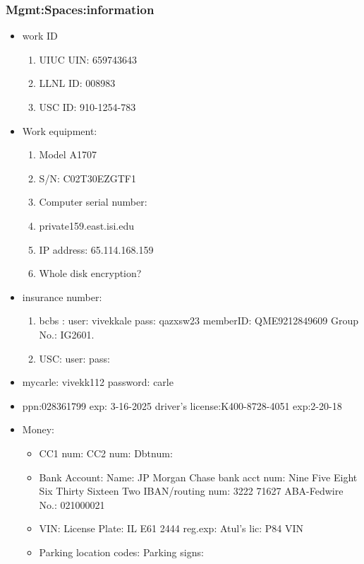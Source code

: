 \begin{frame}[label=myInformation]
\frametitle{Mgmt:Spaces:information}  
      \begin{itemize}
      \tiny \item \tiny work ID
        \begin{enumerate} 
          \tiny \item \tiny UIUC UIN: 659743643 
        \item \tiny LLNL ID: 008983 
        \item \tiny USC ID: 910-1254-783
         \end{enumerate} 
\item \tiny Work equipment: 
\begin{enumerate} 
\tiny \item \tiny Model A1707
\tiny \item \tiny S/N: C02T30EZGTF1
\tiny \item \tiny Computer serial number: 
\tiny \item \tiny private159.east.isi.edu
\item \tiny IP address:  65.114.168.159 
\item \tiny Whole disk encryption? 
\end{enumerate}
      \item \tiny insurance number: 
        \begin{enumerate} 
          \tiny \item \tiny bcbs : user: vivekkale pass: qazxsw23
          memberID: QME9212849609  Group No.: IG2601.
        \item \tiny USC:  user:   pass: 
          \end{enumerate} 
      \item \tiny mycarle: vivekk112 password: carle 
      \item \tiny ppn:028361799  exp: 3-16-2025 driver's license:K400-8728-4051
        exp:2-20-18 
      \item \tiny Money: 
        \begin{itemize}
        \tiny \item \tiny CC1 num: CC2 num: Dbtnum: 
        \item \tiny Bank Account:   
          Name: JP Morgan Chase
          bank acct num: Nine Five
          Eight Six Thirty Sixteen Two
          IBAN/routing num: 3222 71627
          ABA-Fedwire No.: 021000021
        \item \tiny VIN:   License Plate: IL E61 2444 reg.exp:   Atul's lic: P84 VIN
        \item \tiny Parking location codes:   Parking signs: 

\end{itemize}
\end{itemize}
\end{frame}
